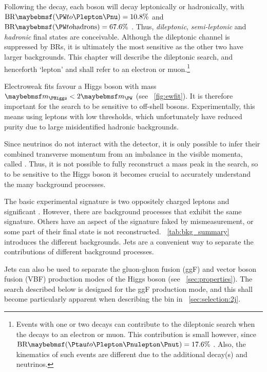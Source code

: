 
Following the \HWW decay, each \PW boson will decay leptonically or hadronically, with 
$\text{BR}\parenths{\HepProcess{\PW\HepTo\Plepton\Pnu}} = 10.8\%$ and 
$\text{BR}\parenths{\HepProcess{\PW\HepTo \text{hadrons}}} = 67.6\%$ \cite{PDG:2012}. 
Thus, \textit{dileptonic}, \textit{semi-leptonic} and \textit{hadronic} final states are 
conceivable. Although the dileptonic channel is suppressed by BRs, it is ultimately 
the most sensitive as the other two have larger backgrounds. This chapter 
will describe the dileptonic search, and henceforth 
`lepton' and \Plepton shall refer to an electron or muon.\footnote{
	Events with one or two \HepProcess{\PW\HepTo\Ptau\Pnu} decays can 
	contribute to the dileptonic search when the \Ptau decays to an electron or muon. This 
	contribution is small however, since
	$\text{BR}\parenths{\HepProcess{\Ptau\HepTo\Plepton\Pnulepton\Pnut}} = 17.6\%$ 
	\cite{PDG:2012}. Also, the kinematics of such events are different due to the 
	additional decay(s) and neutrinos.
}

Electroweak fits favour a Higgs boson with mass $\mH < 2\mW$ (see \Figure~\ref{fig:ewfit}).
It is therefore important for the \HWW search to be sensitive to off-shell \PW bosons. 
Experimentally, this means using leptons with low \pt thresholds, which unfortunately 
have reduced purity due to large misidentified hadronic backgrounds.

Since neutrinos do not interact with the detector, it is only possible to infer their 
combined transverse momentum from an imbalance in the visible momenta, called \met. 
Thus, it is not possible to fully reconstruct a 
mass peak in the \HWWlvlv search, so to be sensitive to the Higgs boson it becomes 
crucial to accurately understand the many background processes.

The basic experimental signature is two oppositely charged leptons and significant \met. 
However, there are background processes that exhibit the same signature. Others have an 
aspect of the signature faked by mismeasurement, or some part of their final state is not 
reconstructed. \Table~\ref{tab:bkg_summary} introduces the different backgrounds. Jets 
are a convenient way to separate the contributions of different background processes.

Jets can also be used to separate the gluon-gluon fusion (ggF) and vector boson fusion 
(VBF) production modes of the Higgs boson (see \Section~\ref{sec:properties}). The search 
described below is designed for the ggF production mode, and this shall become 
particularly apparent when describing the \twojet bin in \Section~\ref{sec:selection:2j}.

